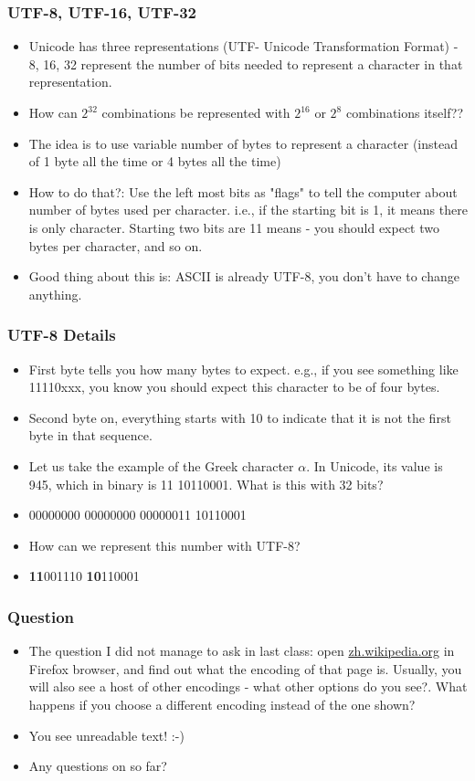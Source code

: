 \documentclass{beamer}
\begin{document}
\begin{frame}
\frametitle{UTF-8, UTF-16, UTF-32}
\begin{itemize}
\item Unicode has three representations (UTF- Unicode Transformation Format) - 8, 16, 32 represent the number of bits needed to represent a character in that representation. \pause
\item How can $2^{32}$ combinations be represented with $2^{16}$ or $2^{8}$ combinations itself?? \pause
\item The idea is to use variable number of bytes to represent a character (instead of 1 byte all the time or 4 bytes all the time)
\item How to do that?: Use the left most bits as "flags" to tell the computer about number of bytes used per character. i.e., if the starting bit is 1, it means there is only character. Starting two bits are 11 means - you should expect two bytes per character, and so on. \pause
\item Good thing about this is: ASCII is already UTF-8, you don't have to change anything.
\end{itemize}
\end{frame}

\begin{frame}
\frametitle{UTF-8 Details}
\begin{itemize}
\item First byte tells you how many bytes to expect. e.g., if you see something like 11110xxx, you know you should expect this character to be of four bytes.
\item Second byte on, everything starts with 10 to indicate that it is not the first byte in that sequence. 
\item Let us take the example of the Greek character $\alpha$. In Unicode, its value is 945, which in binary is 11 10110001. What is this with 32 bits? \pause
\item 00000000 00000000 00000011 10110001
\item How can we represent this number with UTF-8? \pause
\item \textbf{11}001110 \textbf{10}110001
\end{itemize}
\end{frame}

\begin{frame}
\frametitle{Question}
\begin{itemize}
\item The question I did not manage to ask in last class: open \url{zh.wikipedia.org} in Firefox browser, and find out what the encoding of that page is. Usually, you will also see a host of other encodings - what other options do you see?. What happens if you choose a different encoding instead of the one shown?
\pause \item You see unreadable text! :-)
\item Any questions on so far? 
\end{itemize}
\end{frame}
\end{document}

